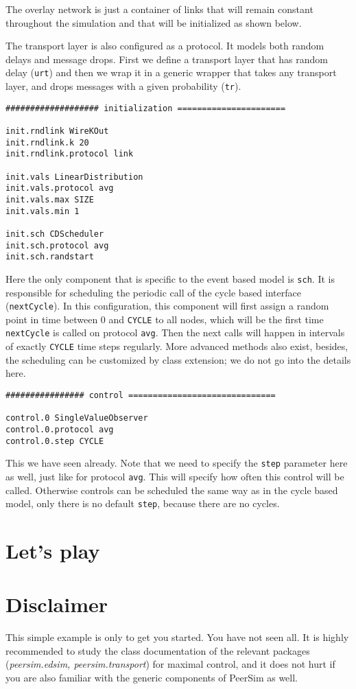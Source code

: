 \documentclass[a4paper,11pt]{article}
\begin{document}
The overlay network is just a container of links that will remain constant
throughout the simulation and that will be initialized as shown below.

The transport layer is also configured as a protocol. It models both random
delays and message drops.
First we define a transport layer that has random delay (\texttt{urt}) and
then we wrap it in a generic wrapper that takes any transport layer, and
drops messages with a given probability (\texttt{tr}).

\footnotesize
\begin{verbatim}
################### initialization ======================

init.rndlink WireKOut
init.rndlink.k 20
init.rndlink.protocol link

init.vals LinearDistribution
init.vals.protocol avg
init.vals.max SIZE
init.vals.min 1

init.sch CDScheduler
init.sch.protocol avg
init.sch.randstart
\end{verbatim}
\normalsize

Here the only component that is specific to the event based model is
\texttt{sch}.
It is responsible for scheduling the periodic call of the cycle based
interface (\texttt{nextCycle}).
In this configuration, this component will first assign a random point in
time between 0 and \texttt{CYCLE} to all nodes, which will be the first
time \texttt{nextCycle} is called on protocol \texttt{avg}.
Then the next calls will happen in intervals of exactly \texttt{CYCLE} time
steps regularly.
More advanced methods also exist, besides, the scheduling can be customized
by class extension; we do not go into the details here.

\footnotesize
\begin{verbatim}
################ control ==============================

control.0 SingleValueObserver
control.0.protocol avg
control.0.step CYCLE
\end{verbatim}
\normalsize

This we have seen already.
Note that we need to specify the \texttt{step} parameter here as well,
just like for protocol \texttt{avg}.
This will specify how often this control will be called.
Otherwise controls can be scheduled the same way as in the cycle based model,
only there is no default \texttt{step}, because there are no cycles.


\section{Let's play}

\section{Disclaimer}

This simple example is only to get you started.
You have not seen all.
It is highly recommended to study the class documentation of the relevant
packages (\emph{peersim.edsim, peersim.transport}) for maximal control,
and it does not hurt if you are also familiar with the generic components
of PeerSim as well.
\end{document}
